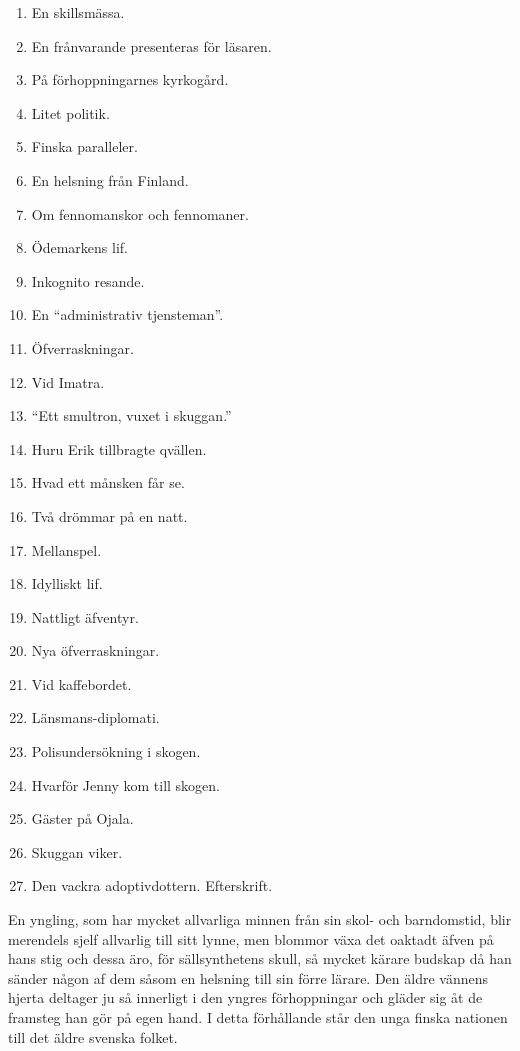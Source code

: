 \begin{enumerate}
\def\labelenumi{\arabic{enumi}.}
\tightlist
\item
  En skillsmässa.
\item
  En frånvarande presenteras för läsaren.
\item
  På förhoppningarnes kyrkogård.
\item
  Litet politik.
\item
  Finska paralleler.
\item
  En helsning från Finland.
\item
  Om fennomanskor och fennomaner.
\item
  Ödemarkens lif.
\item
  Inkognito resande.
\item
  En ``administrativ tjensteman''.
\item
  Öfverraskningar.
\item
  Vid Imatra.
\item
  ``Ett smultron, vuxet i skuggan.''
\item
  Huru Erik tillbragte qvällen.
\item
  Hvad ett månsken får se.
\item
  Två drömmar på en natt.
\item
  Mellanspel.
\item
  Idylliskt lif.
\item
  Nattligt äfventyr.
\item
  Nya öfverraskningar.
\item
  Vid kaffebordet.
\item
  Länsmans-diplomati.
\item
  Polisundersökning i skogen.
\item
  Hvarför Jenny kom till skogen.
\item
  Gäster på Ojala.
\item
  Skuggan viker.
\item
  Den vackra adoptivdottern. Efterskrift.
\end{enumerate}

En yngling, som har mycket allvarliga minnen från sin skol- och
barndomstid, blir merendels sjelf allvarlig till sitt lynne, men blommor
växa det oaktadt äfven på hans stig och dessa äro, för sällsynthetens
skull, så mycket kärare budskap då han sänder någon af dem såsom en
helsning till sin förre lärare. Den äldre vännens hjerta deltager ju så
innerligt i den yngres förhoppningar och gläder sig åt de framsteg han
gör på egen hand. I detta förhållande står den unga finska nationen till
det äldre svenska folket.

